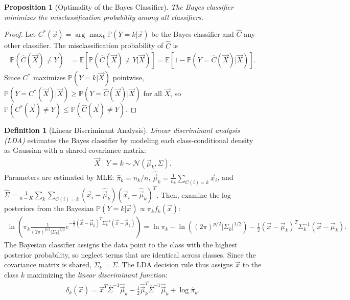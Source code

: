 \documentclass[11pt]{article}
\theoremstyle{definition}
\newtheorem{definition}{Definition}[section]
\theoremstyle{plain}
\newtheorem{proposition}{Proposition}[section]
\theoremstyle{remark}
\begin{document}
\begin{proposition}[Optimality of the Bayes Classifier]
    The Bayes classifier minimizes the misclassification probability among all classifiers.
\end{proposition}
\begin{proof}
    Let $C^*(\vec{x}) = \arg\max_k \mathbb{P}(Y=k|\vec{x})$ be the Bayes classifier and $\hat{C}$ any other classifier. The misclassification probability of $\hat{C}$ is
    \begin{align}
        \mathbb{P}(\hat{C}(\vec{X}) \neq Y) &= \mathbb{E}\left[\mathbb{P}(\hat{C}(\vec{X}) \neq Y | \vec{X})\right] = \mathbb{E}\left[1 - \mathbb{P}(Y = \hat{C}(\vec{X})|\vec{X})\right].
    \end{align}
    Since $C^*$ maximizes $\mathbb{P}(Y = k|\vec{X})$ pointwise, $\mathbb{P}(Y = C^*(\vec{X})|\vec{X}) \geq \mathbb{P}(Y = \hat{C}(\vec{X})|\vec{X})$ for all $\vec{X}$, so $\mathbb{P}(C^*(\vec{X}) \neq Y) \leq \mathbb{P}(\hat{C}(\vec{X}) \neq Y)$.
\end{proof}

\begin{definition}[Linear Discriminant Analysis]
    \textit{Linear discriminant analysis (LDA)} estimates the Bayes classifier by modeling each class-conditional density as Gaussian with a shared covariance matrix:
    \begin{align}
        \vec{X} \mid Y = k \sim \mathcal{N}(\vec{\mu}_k, \Sigma).
    \end{align}
    Parameters are estimated by MLE: $\hat{\pi}_k = n_k/n$, $\hat{\vec{\mu}}_k = \frac{1}{n_k}\sum_{C(i)=k}\vec{x}_i$, and $\hat{\Sigma} = \frac{1}{n-K}\sum_k\sum_{C(i)=k}(\vec{x}_i - \hat{\vec{\mu}}_k)(\vec{x}_i - \hat{\vec{\mu}}_k)^T$. Then, examine the log-posteriors from the Bayesian $\mathbb{P}(Y=k|\vec{x}) \propto \pi_k f_k(\vec{x})$:
    \begin{align}
        \ln\left(\pi_k \frac{1}{(2\pi)^{p/2}|\Sigma_k|^{1/2}}e^{-\frac 12 (\vec{x}-\vec{\mu}_k)^T\Sigma_k^{-1}(\vec{x}-\vec{\mu}_k)}\right) = \ln{\pi_k}- \ln\left((2\pi)^{p/2}|\Sigma_k|^{1/2}\right)-\frac 12 (\vec{x}-\vec{\mu}_k)^T\Sigma_k^{-1}(\vec{x}-\vec{\mu}_k).
    \end{align}
    The Bayesian classifier assigns the data point to the class with the highest posterior probability, so neglect terms that are identical across classes. Since the covariance matrix is shared, $\Sigma_k = \Sigma$. The LDA decision rule thus assigns $\vec{x}$ to the class $k$ maximizing the \emph{linear discriminant function}:
    \begin{align}
        \delta_k(\vec{x}) = \vec{x}^T\hat{\Sigma}^{-1}\hat{\vec{\mu}}_k - \frac{1}{2}\hat{\vec{\mu}}_k^T\hat{\Sigma}^{-1}\hat{\vec{\mu}}_k + \log\hat{\pi}_k.
    \end{align}
\end{definition}
\end{document}

